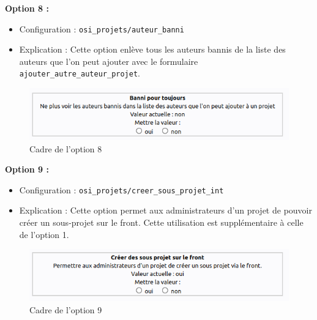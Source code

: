 \newpage

\textbf{Option 8 :} 
\begin{itemize}
    \item Configuration : \texttt{osi\_projets/auteur\_banni}
    \item Explication : Cette option enlève tous les auteurs bannis de la liste des auteurs que l'on peut ajouter avec le formulaire \texttt{ajouter\_autre\_auteur\_projet}.
\end{itemize}
\vspace{0.5cm}
\begin{figure}[h]
    \centering
    \includegraphics[trim=0 0 0 0, clip, width=1\textwidth]{./images/c8.png}
    \caption{Cadre de l'option 8}
    \label{option8}
\end{figure}


\textbf{Option 9 :} 
\begin{itemize}
    \item Configuration : \texttt{osi\_projets/creer\_sous\_projet\_int}
    \item Explication : Cette option permet aux administrateurs d'un projet de pouvoir créer un sous-projet sur le front. Cette utilisation est supplémentaire à celle de l'option 1.
\end{itemize}
\vspace{0.5cm}
\begin{figure}[h]
    \centering
    \includegraphics[trim=0 0 0 0, clip, width=1\textwidth]{./images/c9.png}
    \caption{Cadre de l'option 9}
    \label{option9}
\end{figure}


\newpage

